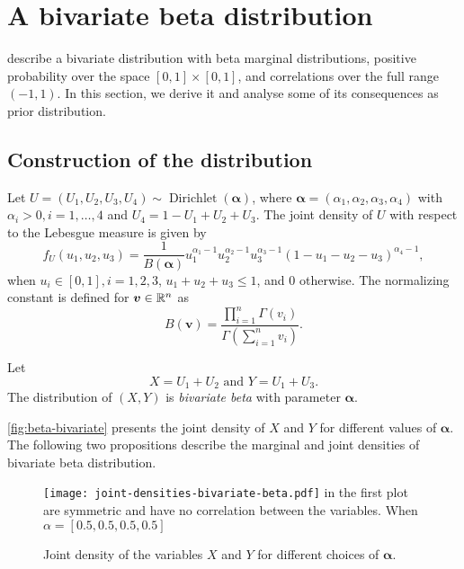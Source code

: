 \chapter{A bivariate beta distribution}
\label{appendix:bivariate-beta-distribution}

\textcite{olkin2015constructions} describe a bivariate distribution with beta
marginal distributions, positive probability over the space $[0,1] \times
[0,1]$, and correlations over the full range $(-1,1)$. In this section, we
derive it and analyse some of its consequences as prior distribution. 

\section{Construction of the distribution}

Let $U = (U_1, U_2, U_3, U_4) \sim
\operatorname{Dirichlet}(\boldsymbol{\alpha})$, where $\boldsymbol{\alpha} =
(\alpha_1, \alpha_2, \alpha_3, \alpha_4)$ with $\alpha_i > 0, i = 1,\dots,4$
and $U_4 = 1 - U_1 + U_2 + U_3$. The joint density of $U$ with respect to the
Lebesgue measure is given by
\begin{equation}
  f_U(u_1, u_2, u_3) = \frac{1}{B(\boldsymbol{\alpha})}u_1^{\alpha_1-1}u_2^{\alpha_2-1}u_3^{\alpha_3-1}(1-u_1-u_2-u_3)^{\alpha_4-1}, 
\end{equation}
when $u_i \in [0,1], i = 1,2,3$, $u_1 + u_2 + u_3 \le 1$, and $0$ otherwise.
The normalizing constant is defined for $\boldsymbol{v} \in \mathbb{R}^n$ as
$$B(\boldsymbol{v}) = \frac{\prod_{i=1}^n \Gamma(v_i)}{\Gamma\left(\sum_{i=1}^n v_i\right)}.$$ 
\begin{definition}
  Let 
  \begin{equation}
    X = U_1 + U_2 \text{ and } Y = U_1 + U_3.
  \end{equation} 
    The distribution of $(X,Y)$ is {\em bivariate beta} with parameter
    $\boldsymbol{\alpha}$. 
\end{definition}

\autoref{fig:beta-bivariate} presents the joint density of $X$ and $Y$ for
different values of $\boldsymbol{\alpha}$. The following two propositions describe the marginal and joint
densities of
bivariate beta distribution.

\begin{figure}[!ht]
  \centering
  \caption{Joint density of the variables $X$ and $Y$ for different choices of $\boldsymbol{\alpha}$.}
  \texttt{[image: joint-densities-bivariate-beta.pdf]}
   in the first plot are
  symmetric and have no correlation between the variables. When $\alpha =
  [0.5, 0.5, 0.5, 0.5]$
  \label{fig:beta-bivariate}
\end{figure}

